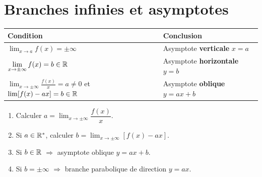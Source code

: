 \section{Branches infinies et asymptotes}

\begin{definition}
  \begin{center}
  \renewcommand{\arraystretch}{2}
  \begin{tabular}{|p{5.5cm}|p{7cm}|}
    \hline
    \textbf{\color{navy}Condition}
      & \textbf{\color{navy}Conclusion} \\
    \hline\hline
    $\displaystyle\lim_{x \to a} f(x) = \pm\infty$
      & Asymptote \textbf{verticale} $x = a$ \\
    \hline
    $\displaystyle\lim_{x \to \pm\infty} f(x) = b \in \mathbb{R}$
      & Asymptote \textbf{horizontale} $y = b$ \\
    \hline
    $\displaystyle\lim_{x \to \pm\infty} \frac{f(x)}{x} = a \neq 0$
    et $\lim [f(x)-ax] = b \in \mathbb{R}$
      & Asymptote \textbf{oblique} $y = ax+b$ \\
    \hline
  \end{tabular}
  \end{center}
\end{definition}

\begin{methode}
  \begin{enumerate}
    \item Calculer $a = \displaystyle\lim_{x \to \pm\infty} \dfrac{f(x)}{x}$.
    \item Si $a \in \mathbb{R}^*$, calculer $b = \displaystyle\lim_{x \to \pm\infty}[f(x) - ax]$.
    \item Si $b \in \mathbb{R}$ $\Rightarrow$ asymptote oblique $y = ax+b$.
    \item Si $b = \pm\infty$ $\Rightarrow$ branche parabolique de direction $y=ax$.
  \end{enumerate}
\end{methode}

